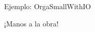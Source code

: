 \documentclass[aspectratio=169]{beamer}
\begin{document}
\begin{frame}[fragile]{Ejemplo: OrgaSmallWithIO}
    \begin{center}
    \huge ¡Manos a la obra!
    \end{center}
\end{frame}

% 
% 
% 
% 
% 
% 
% 
%     
\end{document}
